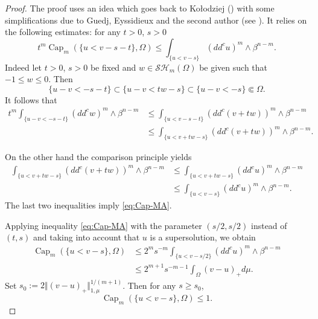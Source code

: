 \documentclass[11pt]{article}
\numberwithin{equation}{section}
\theoremstyle{definition}
\DeclareMathOperator{\Capa}{Cap}
\theoremstyle{plain}
\theoremstyle{definition}
\begin{document}
\begin{proof}
The proof uses an idea which goes back to Ko\l odziej (\cite{Kol96}) with some simplifications due to Guedj, Eyssidieux and the second author (see \cite{EGZ09, GKZ08}). It relies on the following estimates: for any $t > 0$, $s > 0$
\begin{equation}\label{eq:Cap-MA}
t^m \Capa_m(\{u< v -s-t\},\Omega)\leq \int_{\{u<v -s\}}(dd^cu)^m\wedge\beta^{n-m}.
\end{equation}
Indeed let $t > 0$, $s > 0$ be fixed and $ w \in \mathcal{SH}_m(\Omega)$ be given such that $-1 \leq w \leq0$. Then
\[\{u-v<-s-t\}\subset\{u-v< t w -s\} \subset\{u-v<-s\} \Subset\Omega.\]
It follows that
\begin{align*}
t^m \int_{\{u-v<-s-t\}}(dd^c w)^m\wedge\beta^{n-m}&\leq\int_{\{u< v - s-t\}}(dd^c(v+tw))^m\wedge\beta^{n-m}\\
&\leq \int_{\{u< v+ tw - s\}}(dd^c(v+tw))^m\wedge\beta^{n-m}.
\end{align*}

On the other hand the comparison principle yields
\begin{align*}
\int_{\{u< v+ tw - s\}}(dd^c(v+tw))^m\wedge\beta^{n-m} &\leq\int_{\{u < v +t w - s\}}(dd^c u)^m\wedge\beta^{n-m}\\
&\leq\int_{\{u< v -s\}}(dd^cu)^m\wedge\beta^{n-m}.
\end{align*}
The last two inequalities imply \eqref{eq:Cap-MA}.

Applying inequality \eqref{eq:Cap-MA} with the parameter $(s \slash 2, s\slash 2)$ instead of $(t,s)$ and taking into account that $u$ is a supersolution, we obtain
\[
\begin{split}
\Capa_m(\{u< v - s \},\Omega) & \leq 2^m s^{-m} \int_{\{u<v - s\slash 2\}}(dd^cu)^m\wedge\beta^{n-m} \\
& \leq 2^{m + 1} s^{-m - 1} \int_\Omega (v-u)_+ d \mu.
\end{split}
\]
Set $s_0:= 2 \Vert (v-u)_+\Vert_{1,\mu}^{1 \slash (m+1)}$. Then for any $s \geq s_0$,
\begin{equation} \label{eq:smallcap}
\Capa_m(\{u< v - s \},\Omega)\leq 1.
\end{equation}


\end{proof}
\end{document}
